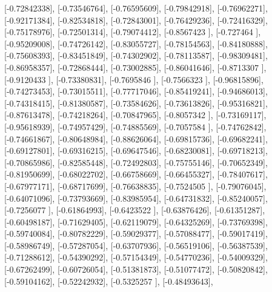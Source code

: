 \documentclass{article}
\begin{document}
       [-0.72842338],
       [-0.73546764],
       [-0.76595609],
       [-0.79842918],
       [-0.76962271],
       [-0.92171384],
       [-0.82534818],
       [-0.72843001],
       [-0.76429236],
       [-0.72416329],
       [-0.75178976],
       [-0.72501314],
       [-0.79074412],
       [-0.8567423 ],
       [-0.727464  ],
       [-0.95209008],
       [-0.74726142],
       [-0.83055727],
       [-0.78154563],
       [-0.84180888],
       [-0.75608393],
       [-0.83451849],
       [-0.74302902],
       [-0.78113587],
       [-0.98309481],
       [-0.86958357],
       [-0.72868444],
       [-0.73002885],
       [-0.86041646],
       [-0.8713307 ],
       [-0.9120433 ],
       [-0.73380831],
       [-0.7695846 ],
       [-0.7566323 ],
       [-0.96815896],
       [-0.74273453],
       [-0.73015511],
       [-0.77717046],
       [-0.85419241],
       [-0.94686013],
       [-0.74318415],
       [-0.81380587],
       [-0.73584626],
       [-0.73613826],
       [-0.95316821],
       [-0.87613478],
       [-0.74218264],
       [-0.70847965],
       [-0.8057342 ],
       [-0.73169117],
       [-0.95618939],
       [-0.74957429],
       [-0.74885569],
       [-0.7057584 ],
       [-0.74762842],
       [-0.74661867],
       [-0.80648984],
       [-0.88626064],
       [-0.69815736],
       [-0.69682241],
       [-0.69127801],
       [-0.69316215],
       [-0.69647546],
       [-0.68230081],
       [-0.69718213],
       [-0.70865986],
       [-0.82585448],
       [-0.72492803],
       [-0.75755146],
       [-0.70652349],
       [-0.81950699],
       [-0.68022702],
       [-0.66758669],
       [-0.66455327],
       [-0.78407617],
       [-0.67977171],
       [-0.68717699],
       [-0.76638835],
       [-0.7524505 ],
       [-0.79076045],
       [-0.64071096],
       [-0.73793669],
       [-0.83985954],
       [-0.64731832],
       [-0.85240057],
       [-0.7256077 ],
       [-0.61864993],
       [-0.6423522 ],
       [-0.63876426],
       [-0.61351287],
       [-0.60498187],
       [-0.71629405],
       [-0.62119079],
       [-0.64325269],
       [-0.73769398],
       [-0.59740084],
       [-0.80782229],
       [-0.59029377],
       [-0.57088477],
       [-0.59017419],
       [-0.58986749],
       [-0.57287054],
       [-0.63707936],
       [-0.56519106],
       [-0.56387539],
       [-0.71288612],
       [-0.54390292],
       [-0.57154349],
       [-0.54770236],
       [-0.54009329],
       [-0.67262499],
       [-0.60726054],
       [-0.51381873],
       [-0.51077472],
       [-0.50820842],
       [-0.59104162],
       [-0.52242932],
       [-0.5325257 ],
       [-0.48493643],
\end{document}
